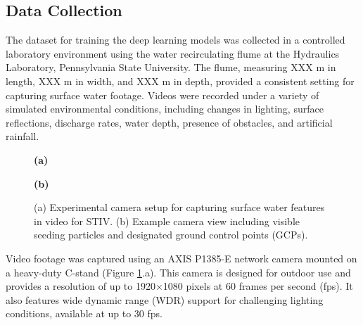 \documentclass[12pt]{elsarticle}
\begin{document}
\subsection{Data Collection}
The dataset for training the deep learning models was collected in a controlled laboratory environment using the water recirculating flume at the Hydraulics Laboratory, Pennsylvania State University. The flume, measuring XXX m in length, XXX m in width, and XXX m in depth, provided a consistent setting for capturing surface water footage. Videos were recorded under a variety of simulated environmental conditions, including changes in lighting, surface reflections, discharge rates, water depth, presence of obstacles, and artificial rainfall.
\begin{figure}[!htbp]
    \centering
    \begin{minipage}[b]{0.48\textwidth}
        \centering
        \setlength{\fboxsep}{0pt}
        \textbf{(a)} 
    \end{minipage}
    \hfill
    \begin{minipage}[b]{0.48\textwidth}
        \centering
        \setlength{\fboxsep}{0pt}
        \textbf{(b)}
    \end{minipage}
    \caption{(a) Experimental camera setup for capturing surface water features in video for STIV. (b) Example camera view including visible seeding particles and designated ground control points (GCPs).}
    \label{fig:camera_setup}
\end{figure}

Video footage was captured using an AXIS P1385-E network camera mounted on a heavy-duty C-stand (Figure \ref{fig:camera_setup}.a). This camera is designed for outdoor use and provides a resolution of up to 1920×1080 pixels at 60 frames per second (fps). It also features wide dynamic range (WDR) support for challenging lighting conditions, available at up to 30 fps.
\end{document}
